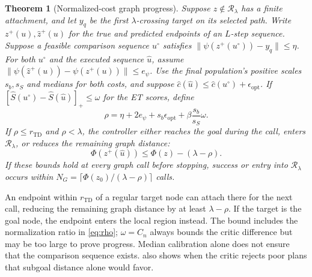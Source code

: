 \documentclass{article}
\newcommand{\Htd}{r_{\mathrm{TD}}}
\newcommand{\Rset}{\mathcal R_\lambda}
\newtheorem{theorem}{Theorem}
\theoremstyle{definition}
\theoremstyle{remark}
\begin{document}
\begin{theorem}[Normalized-cost graph progress]
\label{thm:graph-progress}
Suppose $z\notin\Rset$ has a finite attachment, and let $y_q$ be the first
$\lambda$-crossing target on its selected path.
Write $z^+(u),\hat z^+(u)$ for the true and predicted endpoints of an $L$-step sequence.
Suppose a feasible comparison sequence $u^\circ$ satisfies
$\|\psi(z^+(u^\circ))-y_q\|\le\eta$.
For both $u^\circ$ and the executed sequence $\hat u$, assume
$\|\psi(\hat z^+(u))-\psi(z^+(u))\|\le e_\psi$.
Use the final population's positive scales $s_b,s_S$ and medians for both costs, and suppose
$\hat c(\hat u)\le\hat c(u^\circ)+\epsilon_{\mathrm{opt}}$.
If
$[\widehat S(u^\circ)-\widehat S(\hat u)]_+\le\omega$ for the ET scores, define
\begin{equation}
 \rho=\eta+2e_\psi+s_b\epsilon_{\mathrm{opt}}
                  +\beta\frac{s_b}{s_S}\omega .
 \label{eq:rho}
\end{equation}
If $\rho\le\Htd$ and $\rho<\lambda$, the controller either reaches the goal during the call,
enters $\Rset$, or reduces the remaining graph distance:
\begin{equation}
 \Phi(z^+(\hat u))\le\Phi(z)-(\lambda-\rho).
 \label{eq:graph-descent}
\end{equation}
If these bounds hold at every graph call before stopping, success or entry into $\Rset$ occurs within
$N_G=\lceil\Phi(z_0)/(\lambda-\rho)\rceil$ calls.
\end{theorem}

An endpoint within $\Htd$ of a regular target node can attach there for the next call,
reducing the remaining graph distance by at least $\lambda-\rho$.
If the target is the goal node, the endpoint enters the local region instead.
The bound includes the normalization ratio in \cref{eq:rho}; $\omega=C_n$ always bounds
the critic difference but may be too large to prove progress. Median calibration alone
does not ensure that the comparison sequence exists.  also
shows when the critic rejects poor plans that subgoal distance alone would favor.
\end{document}
